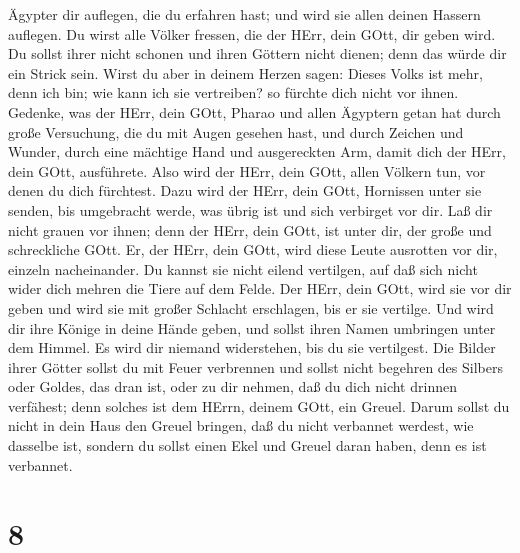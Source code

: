 Ägypter dir auflegen, die du erfahren hast; und wird sie allen deinen
Hassern auflegen.  Du wirst alle Völker fressen, die der
HErr, dein GOtt, dir geben wird. Du sollst ihrer nicht schonen und ihren
Göttern nicht dienen; denn das würde dir ein Strick sein. 
Wirst du aber in deinem Herzen sagen: Dieses Volks ist mehr, denn ich
bin; wie kann ich sie vertreiben?  so fürchte dich nicht
vor ihnen. Gedenke, was der HErr, dein GOtt, Pharao und allen Ägyptern
getan hat  durch große Versuchung, die du mit Augen gesehen
hast, und durch Zeichen und Wunder, durch eine mächtige Hand und
ausgereckten Arm, damit dich der HErr, dein GOtt, ausführete. Also wird
der HErr, dein GOtt, allen Völkern tun, vor denen du dich fürchtest.
 Dazu wird der HErr, dein GOtt, Hornissen unter sie senden,
bis umgebracht werde, was übrig ist und sich verbirget vor dir.
 Laß dir nicht grauen vor ihnen; denn der HErr, dein GOtt,
ist unter dir, der große und schreckliche GOtt.  Er, der
HErr, dein GOtt, wird diese Leute ausrotten vor dir, einzeln
nacheinander. Du kannst sie nicht eilend vertilgen, auf daß sich nicht
wider dich mehren die Tiere auf dem Felde.  Der HErr, dein
GOtt, wird sie vor dir geben und wird sie mit großer Schlacht
erschlagen, bis er sie vertilge.  Und wird dir ihre Könige
in deine Hände geben, und sollst ihren Namen umbringen unter dem Himmel.
Es wird dir niemand widerstehen, bis du sie vertilgest. 
Die Bilder ihrer Götter sollst du mit Feuer verbrennen und sollst nicht
begehren des Silbers oder Goldes, das dran ist, oder zu dir nehmen, daß
du dich nicht drinnen verfähest; denn solches ist dem HErrn, deinem
GOtt, ein Greuel.  Darum sollst du nicht in dein Haus den
Greuel bringen, daß du nicht verbannet werdest, wie dasselbe ist,
sondern du sollst einen Ekel und Greuel daran haben, denn es ist
verbannet.

\hypertarget{section-7}{%
\section{8}\label{section-7}}

